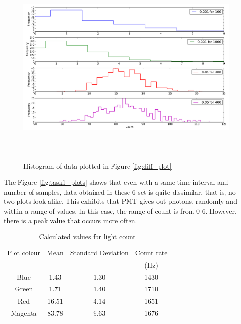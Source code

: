 \documentclass[a4paper,12pt]{article}
\begin{document}
\begin{figure}[H]
\centering
\includegraphics[angle=0,height=10cm,width=15.5cm]{graphs/diff_hist.pdf}
\caption{Histogram of data plotted in Figure \ref{fig:diff_plot}}
\label{fig:diff_hist}
\end{figure}

The Figure \ref{fig:task1_plots} shows that even with a same time interval and number of samples, data obtained in these 6 set is quite dissimilar, that is, no two plots look alike. This exhibits that PMT gives out photons, randomly and within a range of values. In this case, the range of count is from 0-6. However, there is a peak value that occurs more often.   

\begin{table}[H]
\centering %
\caption{Calculated values for light count}
\footnotesize

\begin{tabular}{cccc}%
\hline
\hline

Plot colour  & Mean & Standard Deviation & Count rate \\
& & &(Hz)\\ 
\hline
\hline
Blue&  1.43 &   1.30 & 1430\\
Green&  1.71&  1.40&  1710\\
 Red &16.51   &   4.14 & 1651\\
 Magenta & 83.78  &  9.63 & 1676\\
\hline
\hline

\end{tabular}
\label{table:light} %
\end{table}
\end{document}
